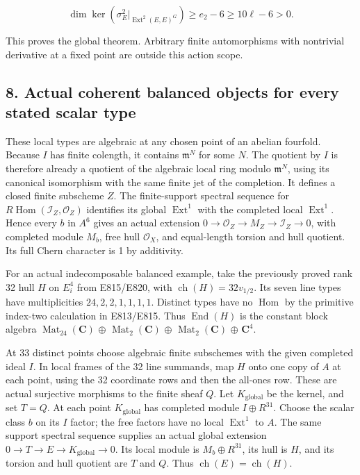 \[
 \dim\ker(\sigma^2_E|_{\operatorname{Ext}^2(E,E)^G})
       \ge e_2-6\ge10\ell-6>0.
 \tag{SC.26}
\]

This proves the global theorem. Arbitrary finite automorphisms with
nontrivial derivative at a fixed point are outside this action scope.

\subsection{8. Actual coherent balanced objects for every stated scalar type}\label{SF-E847:s8}

These local types are algebraic at any chosen point of an abelian
fourfold. Because \(I\) has finite colength, it contains \(\mathfrak m^N\) for some \(N\).
The quotient by \(I\) is therefore already a quotient of the algebraic
local ring modulo \(\mathfrak m^N\), using its canonical isomorphism with the same
finite jet of the completion. It defines a closed finite subscheme \(Z\).
The finite-support spectral sequence for \(R\operatorname{Hom}(\mathcal I_Z,\mathcal O_Z)\) identifies its
global \(\operatorname{Ext}^1\) with the completed local \(\operatorname{Ext}^1\). Hence every \(b\) in \(A^6\) gives
an actual extension \(0\to\mathcal O_Z\to M_Z\to\mathcal I_Z\to0\), with completed module \(M_b\),
free hull \(\mathcal O_X\), and equal-length torsion and hull quotient. Its full
Chern character is 1 by additivity.

For an actual indecomposable balanced example, take the previously proved
rank 32 hull \(H\) on \(E_i^4\) from E815/E820, with \(\operatorname{ch}(H)=32v_{1/2}\). Its seven
line types have multiplicities \(24,2,2,1,1,1,1\). Distinct types have no \(\operatorname{Hom}\)
by the primitive index-two calculation in E813/E815. Thus \(\operatorname{End}(H)\) is
the constant block algebra \(\operatorname{Mat}_{24}(\mathbf C)\) \(\oplus\) \(\operatorname{Mat}_2(\mathbf C)\) \(\oplus\) \(\operatorname{Mat}_2(\mathbf C)\)
\(\oplus\) \(\mathbf C^4\).

At 33 distinct points choose algebraic finite subschemes with the given
completed ideal \(I\). In local frames of the 32 line summands, map \(H\) onto
one copy of \(A\) at each point, using the 32 coordinate rows and then the
all-ones row. These are actual surjective morphisms to the finite sheaf
\(Q\). Let \(K_{\mathrm{global}}\) be the kernel, and set \(T=Q\). At each point \(K_{\mathrm{global}}\) has
completed module \(I\oplus R^{31}\). Choose the scalar class \(b\) on its \(I\)
factor; the free factors have no local \(\operatorname{Ext}^1\) to \(A\). The same support
spectral sequence supplies an actual global extension
\(0\to T\to E\to K_{\mathrm{global}}\to0\). Its local module is \(M_b\oplus R^{31}\), its hull
is \(H\), and its torsion and hull quotient are \(T\) and \(Q\). Thus \(\operatorname{ch}(E)=\operatorname{ch}(H)\).

